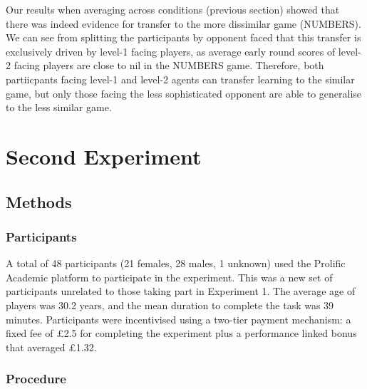 \documentclass[man,floatsintext]{apa6}
\begin{document}
Our results when averaging across conditions (previous section) showed that there was indeed evidence for transfer to the more dissimilar game (NUMBERS). We can see from splitting the participants by opponent faced that this transfer is exclusively driven by level-1 facing players, as average early round scores of level-2 facing players are close to nil in the NUMBERS game. Therefore, both partiicpants facing level-1 and level-2 agents can transfer learning to the similar game, but only those facing the less sophisticated opponent are able to generalise to the less similar game.

\newpage

\hypertarget{second-experiment}{%
\section{Second Experiment}\label{second-experiment}}

\hypertarget{methods-1}{%
\subsection{Methods}\label{methods-1}}

\hypertarget{participants-1}{%
\subsubsection{Participants}\label{participants-1}}

A total of 48 participants (21 females, 28 males, 1 unknown) used the Prolific Academic platform to participate in the experiment. This was a new set of participants unrelated to those taking part in Experiment 1. The average age of players was 30.2 years, and the mean duration to complete the task was 39 minutes. Participants were incentivised using a two-tier payment mechanism: a fixed fee of £2.5 for completing the experiment plus a performance linked bonus that averaged £1.32.

\hypertarget{procedure-1}{%
\subsubsection{Procedure}\label{procedure-1}}
\end{document}

